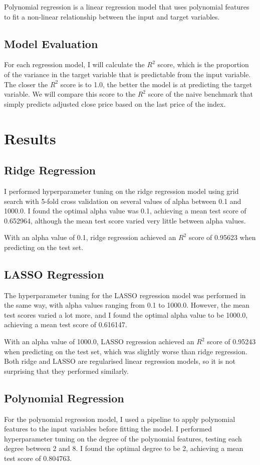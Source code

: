 \documentclass[a4paper, 11pt]{article}
\begin{document}
Polynomial regression is a linear regression model that uses polynomial features to fit a non-linear relationship between the input and target variables.

\subsection{Model Evaluation}
For each regression model, I will calculate the $R^2$ score, which is the proportion of the variance in the target variable that is predictable from the input variable. The closer the $R^2$ score is to 1.0, the better the model is at predicting the target variable. We will compare this score to the $R^2$ score of the naive benchmark that simply predicts adjusted close price based on the last price of the index.

\section{Results}
\subsection{Ridge Regression}
I performed hyperparameter tuning on the ridge regression model using grid search with 5-fold cross validation on several values of alpha between 0.1 and 1000.0. I found the optimal alpha value was 0.1, achieving a mean test score of 0.652964, although the mean test score varied very little between alpha values.

With an alpha value of 0.1, ridge regression achieved an $R^2$ score of 0.95623 when predicting on the test set.

\subsection{LASSO Regression}
The hyperparameter tuning for the LASSO regression model was performed in the same way, with alpha values ranging from 0.1 to 1000.0. However, the mean test scores varied a lot more, and I found the optimal alpha value to be 1000.0, achieving a mean test score of 0.616147.

With an alpha value of 1000.0, LASSO regression achieved an $R^2$ score of 0.95243 when predicting on the test set, which was slightly worse than ridge regression. Both ridge and LASSO are regularised linear regression models, so it is not surprising that they performed similarly.

\subsection{Polynomial Regression}
For the polynomial regression model, I used a pipeline to apply polynomial features to the input variables before fitting the model. I performed hyperparameter tuning on the degree of the polynomial features, testing each degree between 2 and 8. I found the optimal degree to be 2, achieving a mean test score of 0.804763.
\end{document}
